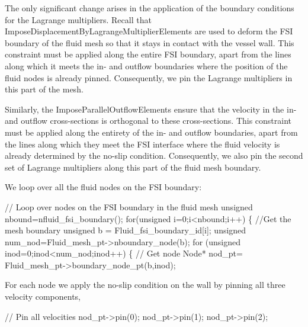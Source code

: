 The only significant change arises in the application of the boundary conditions for the Lagrange multipliers. Recall that {\ttfamily Impose\+Displacement\+By\+Lagrange\+Multiplier\+Elements} are used to deform the F\+SI boundary of the fluid mesh so that it stays in contact with the vessel wall. This constraint must be applied along the entire F\+SI boundary, apart from the lines along which it meets the in-\/ and outflow boundaries where the position of the fluid nodes is already pinned. Consequently, we pin the Lagrange multipliers in this part of the mesh.

Similarly, the {\ttfamily Impose\+Parallel\+Outflow\+Elements} ensure that the velocity in the in-\/ and outflow cross-\/sections is orthogonal to these cross-\/sections. This constraint must be applied along the entirety of the in-\/ and outflow boundaries, apart from the lines along which they meet the F\+SI interface where the fluid velocity is already determined by the no-\/slip condition. Consequently, we also pin the second set of Lagrange multipliers along this part of the fluid mesh boundary.

We loop over all the fluid nodes on the F\+SI boundary\+:


\begin{DoxyCodeInclude}
 \textcolor{comment}{// Loop over nodes on the FSI boundary in the fluid mesh}
 \textcolor{keywordtype}{unsigned} nbound=nfluid\_fsi\_boundary();
 \textcolor{keywordflow}{for}(\textcolor{keywordtype}{unsigned} i=0;i<nbound;i++)
  \{
   \textcolor{comment}{//Get the mesh boundary}
   \textcolor{keywordtype}{unsigned} b = Fluid\_fsi\_boundary\_id[i];
   \textcolor{keywordtype}{unsigned} num\_nod=Fluid\_mesh\_pt->nboundary\_node(b);
   \textcolor{keywordflow}{for} (\textcolor{keywordtype}{unsigned} inod=0;inod<num\_nod;inod++)
    \{
     \textcolor{comment}{// Get node}
     Node* nod\_pt= Fluid\_mesh\_pt->boundary\_node\_pt(b,inod);

\end{DoxyCodeInclude}


For each node we apply the no-\/slip condition on the wall by pinning all three velocity components,


\begin{DoxyCodeInclude}
     
     \textcolor{comment}{// Pin all velocities}
     nod\_pt->pin(0); 
     nod\_pt->pin(1); 
     nod\_pt->pin(2); 

\end{DoxyCodeInclude}


